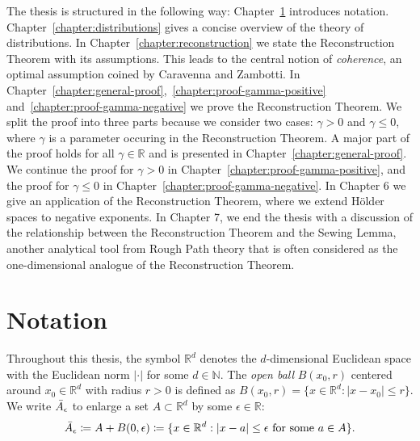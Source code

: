 The thesis is structured in the following way: Chapter~\ref{chapter:notation} introduces notation. Chapter~\ref{chapter:distributions} gives a concise overview of the theory of distributions. In Chapter~\ref{chapter:reconstruction} we state the Reconstruction Theorem with its assumptions. This leads to the central notion of \emph{coherence}, an optimal assumption coined by Caravenna and Zambotti. In Chapter~\ref{chapter:general-proof},~\ref{chapter:proof-gamma-positive} and~\ref{chapter:proof-gamma-negative} we prove the Reconstruction Theorem. We split the proof into three parts because we consider two cases: \(\gamma > 0\) and \(\gamma \leq 0\), where \({\gamma}\) is a parameter occuring in the Reconstruction Theorem. A major part of the proof holds for all \(\gamma \in \mathbb{R}\) and is presented in Chapter~\ref{chapter:general-proof}. We continue the proof for \(\gamma > 0\) in Chapter~\ref{chapter:proof-gamma-positive}, and the proof for \(\gamma \leq 0\) in Chapter~\ref{chapter:proof-gamma-negative}. In Chapter 6 we give an application of the Reconstruction Theorem, where we extend Hölder spaces to negative exponents. In Chapter 7, we end the thesis with a discussion of the relationship between the Reconstruction Theorem and the Sewing Lemma, another analytical tool from Rough Path theory that is often considered as the one-dimensional analogue of the Reconstruction Theorem.


\section{Notation}\label{chapter:notation}

Throughout this thesis, the symbol \( \mathbb{R}^d \) denotes the \( d \)-dimensional Euclidean space with the Euclidean norm \( |\cdot| \) for some \( d \in \mathbb{N} \). The \emph{open ball} \(B(x_0, r)\)  centered around \(x_0 \in \mathbb{R}^d\) with radius \(r > 0\) is defined as \(B(x_0,r) = \{ x \in \mathbb{R}^d : |x - x_0| \leq r \} \). We write \(\bar{A}_{\epsilon}\) to enlarge a set \(A \subset \mathbb{R}^d\) by some \(\epsilon \in \mathbb{R} \): 
\begin{align*}
    \bar{A}_{\epsilon} \coloneqq A + B(0, \epsilon) \coloneqq \{ x \in \mathbb{R}^d : |x - a| \leq \epsilon \text{ for some \(a \in A\)} \}.
\end{align*}

